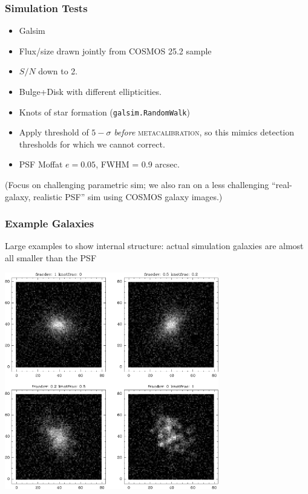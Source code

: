 \documentclass{beamer}
\newcommand{\mcal}{\textsc{metacalibration}}
\begin{document}
\frame
{

    \frametitle{Simulation Tests}


    \begin{itemize}
        \item Galsim
        \item Flux/size drawn jointly from COSMOS 25.2 sample
        \item $S/N$ down to 2.
        \item Bulge+Disk with different ellipticities.
        \item Knots of star formation (\texttt{galsim.RandomWalk})
        \item Apply threshold of $5-\sigma$ {\em before} \mcal, so this
            mimics detection thresholds for which we cannot correct.
        \item PSF Moffat $e=0.05$, FWHM = 0.9 arcsec.
    \end{itemize}

    (Focus on challenging parametric sim; we also ran on a less challenging 
    ``real-galaxy, realistic PSF'' sim using COSMOS galaxy images.)

}

{

    \frame
    {
        \frametitle{Example Galaxies}
     
        {\small Large examples to show internal structure:  actual simulation
        galaxies are almost all smaller than the PSF }

        \begin{center}
            \includegraphics[width=0.7\textwidth]{mosaic-009086.pdf}
            \newline
        \end{center}

    }


}
\end{document}
